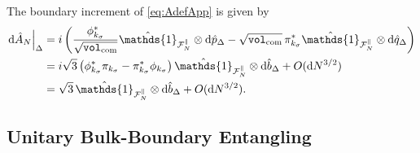 \documentclass{article}
\def\cF{{\cal F}}
\newcommand{\openone}{\hat{\mathds{1}}}
\newcommand{\VF}{\mathtt{vol}_{\rm com}}
\numberwithin{equation}{section}
\begin{document}
	The boundary increment of \cref{eq:AdefApp} is given by
	\begin{align}
		\left.\dd\hat A_N\right|_\Delta &= i\left( \frac{\phi_{k_{\sigma}}^*}{\sqrt{\VF}} \openone_{\cF_N^\parallel}\otimes \dd\hat p_\Delta - \sqrt{\VF}\,\pi_{k_{\sigma}}^* \openone_{\cF_N^\parallel}\otimes \dd\hat q_\Delta \right) \nonumber\\ &= i\sqrt3 \left( \phi_{k_{\sigma}}^*\pi_{k_{\sigma}} - \pi_{k_{\sigma}}^*\phi_{k_{\sigma}} \right) \openone_{\cF_N^\parallel}\otimes \dd\hat b_\Delta + O(\dd N^{3/2}) \nonumber\\ &= \sqrt3\,\openone_{\cF_N^\parallel}\otimes \dd\hat b_\Delta + O(\dd N^{3/2}).
		\label{eq:dAboundary}
	\end{align}

	\subsection{Unitary Bulk-Boundary Entangling}
	\label{appA:Unitary}
\end{document}
